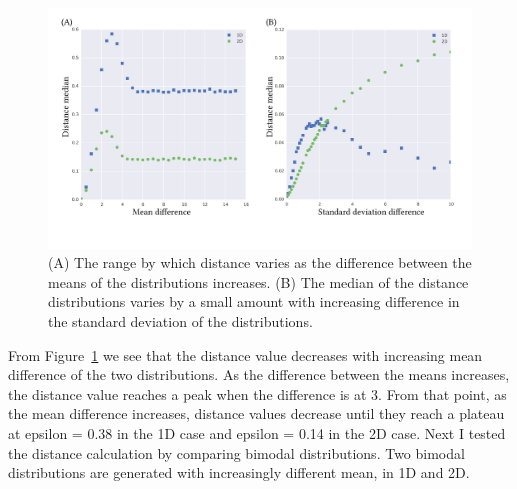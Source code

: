 \begin{figure}[htb]
\centering
\includegraphics[scale=0.7]{../../chapters/chapterABCFlow/images/mus_sigmas-01.png}
\caption[Range of distance values using the kernel distance]{\label{fig:epsilon_mu_s_diff}(A) The range by which distance varies as the difference between the means of the distributions increases. (B) The median of the distance distributions varies by a small amount with increasing difference in the standard deviation of the distributions.}
\end{figure}

From Figure~\ref{fig:epsilon_mu_s_diff} we see that the distance value decreases with increasing mean difference of the two distributions. As the difference between the means increases, the distance value reaches a peak when the difference is at 3. From that point, as the mean difference increases, distance values decrease until they reach a plateau at epsilon = 0.38 in the 1D case and epsilon = 0.14 in the 2D case. Next I tested the distance calculation by comparing bimodal distributions. Two bimodal distributions are generated with increasingly different mean, in 1D and 2D. 


